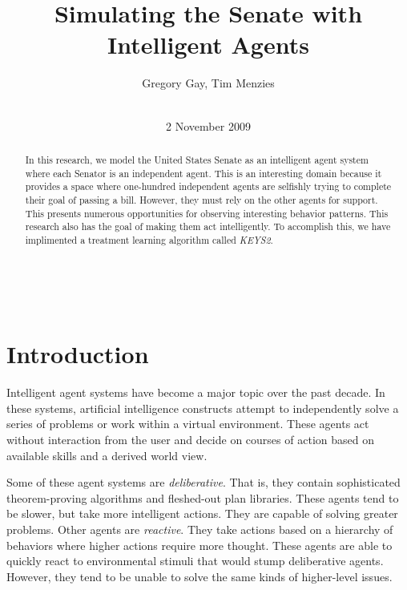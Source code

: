 \documentclass{sig-alternate}
\newcounter{over}
\begin{document}
\conferenceinfo{~} {~} 




\title{Simulating the Senate with Intelligent Agents}

\author{
\alignauthor Gregory Gay, Tim Menzies
\\
       \\
}
%
\date{2 November 2009}

\maketitle
\begin{abstract}
In this research, we model the United States Senate as an intelligent agent system where each Senator is an 
independent agent. 
This is an interesting domain because it provides a space where one-hundred independent 
agents are selfishly trying to complete their goal of passing a bill. However, they must rely on the other agents for support. This 
presents numerous opportunities for observing interesting behavior patterns. 
This research also has the goal of making them act intelligently. To accomplish this, we have implimented a 
treatment learning algorithm called {\em KEYS2}.
\end{abstract}

\section{Introduction}

Intelligent agent systems have become a major topic over the past decade. In these systems, artificial intelligence constructs
attempt to independently solve a series of problems or work within a virtual environment. These agents act without interaction 
from the user and decide on courses of action based on available skills and a derived world view. 

Some of these agent systems are {\em deliberative}. That is, they contain sophisticated theorem-proving algorithms and fleshed-out plan
libraries. These agents tend to be slower, but take more intelligent actions. They are capable of solving greater problems. Other agents are
{\em reactive}. They take actions based on a hierarchy of behaviors where higher actions require more thought. These agents are able to
quickly react to environmental stimuli that would stump deliberative agents. However, they tend to be unable to solve the same kinds of
higher-level issues. 
\end{document}
